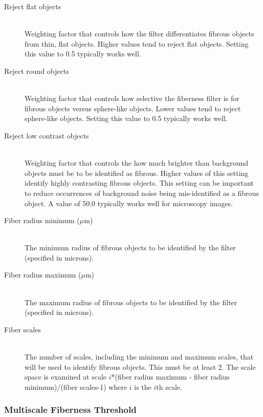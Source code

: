 \documentclass[11pt,titlepage,twoside]{article}
\begin{document}
\begin{description}

\item[Reject flat objects] \hfill \\
Weighting factor that controls how the filter differentiates fibrous objects from thin, flat objects. Higher values tend to reject flat objects. Setting this value to 0.5 typically works well.

\item[Reject round objects] \hfill \\
Weighting factor that controls how selective the fiberness filter is for fibrous objects versus sphere-like objects. Lower values tend to reject sphere-like objects. Setting this value to 0.5 typically works well.

\item[Reject low contrast objects] \hfill \\
Weighting factor that controls the how much brighter than background objects must be to be identified as fibrous. Higher values of this setting identify highly contrasting fibrous objects. This setting can be important to reduce occurrences of background noise being mis-identified as a
fibrous object. A value of 50.0 typically works well for microscopy images.

\item[Fiber radius minimum ($\mu$m)] \hfill \\
The minimum radius of fibrous objects to be identified by the filter (specified in microns).

\item[Fiber radius maximum ($\mu$m)] \hfill \\
The maximum radius of fibrous objects to be identified by the filter (specified in microns).

\item[Fiber scales] \hfill \\
The number of scales, including the minimum and maximum scales, that will be used to identify fibrous objects. This must be at least 2. The scale space is examined at scale $i$*(fiber radius maximum - fiber radius minimum)/(fiber scales-1) where $i$ is the $i$th scale.

\end{description}

\subsubsection{Multiscale Fiberness Threshold}
\end{document}
